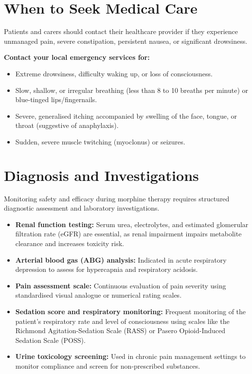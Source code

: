 \section*{When to Seek Medical Care}
Patients and carers should contact their healthcare provider if they experience unmanaged pain, severe constipation, persistent nausea, or significant drowsiness.

\textbf{Contact your local emergency services for:}
\begin{itemize}
    \item Extreme drowsiness, difficulty waking up, or loss of consciousness.
    \item Slow, shallow, or irregular breathing (less than 8 to 10 breaths per minute) or blue-tinged lips/fingernails.
    \item Severe, generalised itching accompanied by swelling of the face, tongue, or throat (suggestive of anaphylaxis).
    \item Sudden, severe muscle twitching (myoclonus) or seizures.
\end{itemize}

\section*{Diagnosis and Investigations}
Monitoring safety and efficacy during morphine therapy requires structured diagnostic assessment and laboratory investigations.
\begin{itemize}
    \item \textbf{Renal function testing:} Serum urea, electrolytes, and estimated glomerular filtration rate (eGFR) are essential, as renal impairment impairs metabolite clearance and increases toxicity risk.
    \item \textbf{Arterial blood gas (ABG) analysis:} Indicated in acute respiratory depression to assess for hypercapnia and respiratory acidosis.
    \item \textbf{Pain assessment scale:} Continuous evaluation of pain severity using standardised visual analogue or numerical rating scales.
    \item \textbf{Sedation score and respiratory monitoring:} Frequent monitoring of the patient's respiratory rate and level of consciousness using scales like the Richmond Agitation-Sedation Scale (RASS) or Pasero Opioid-Induced Sedation Scale (POSS).
    \item \textbf{Urine toxicology screening:} Used in chronic pain management settings to monitor compliance and screen for non-prescribed substances.
\end{itemize}

